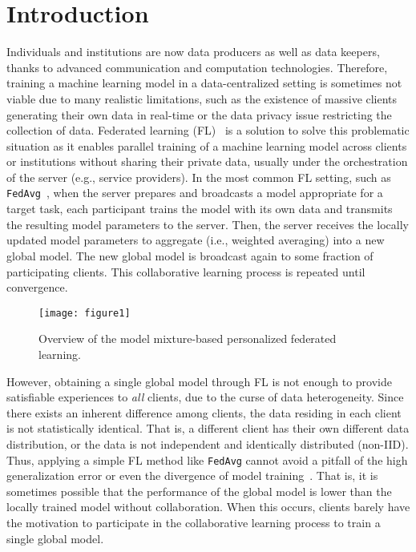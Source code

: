 \documentclass[sigconf]{acmart}
\begin{document}

\maketitle
\section{Introduction}
Individuals and institutions are now data producers as well as data keepers, thanks to advanced communication and computation technologies. Therefore, training a machine learning model in a data-centralized setting is sometimes not viable due to many realistic limitations, such as the existence of massive clients generating their own data in real-time or the data privacy issue restricting the collection of data. Federated learning (FL)~\cite{mc+17} is a solution to solve this problematic situation as it enables parallel training of a machine learning model across clients or institutions without sharing their private data, usually under the orchestration of the server (e.g., service providers). In the most common FL setting, such as \texttt{FedAvg}~\cite{mc+17}, when the server prepares and broadcasts a model appropriate for a target task, each participant trains the model with its own data and transmits the resulting model parameters to the server. Then, the server receives the locally updated model parameters to aggregate (i.e., weighted averaging) into a new global model. The new global model is broadcast again to some fraction of participating clients. This collaborative learning process is repeated until convergence. 
\begin{figure}
\centering
\texttt{[image: figure1]}
\caption{Overview of the model mixture-based personalized federated learning.}
\label{fig1}
\end{figure}
However, obtaining a single global model through FL is not enough to provide satisfiable experiences to \textit{all} clients, due to the curse of data heterogeneity. Since there exists an inherent difference among clients, the data residing in each client is not statistically identical. That is, a different client has their own different data distribution, or the data is not independent and identically distributed (non-IID). Thus, applying a simple FL method like \texttt{FedAvg} cannot avoid a pitfall of the high generalization error or even the divergence of model training~\cite{ka+19}. That is, it is sometimes possible that the performance of the global model is lower than the locally trained model without collaboration. When this occurs, clients barely have the motivation to participate in the collaborative learning process to train a single global model.
\end{document}
